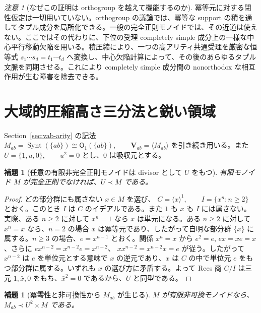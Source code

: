 \documentclass[10pt,a4paper]{ltjsarticle}
\newtheorem{lemma}[theorem]{補題}
\theoremstyle{definition}
\theoremstyle{remark}
\newtheorem{remark}[theorem]{注意}
\newcommand{\Obj}{\mathsf O}
\begin{document}
\begin{remark}[なぜこの証明は orthogroup を越えて機能するのか]
冪等元に対する閉性仮定は一切用いていない。orthogroup の議論では、冪等な support の積を通してタプル成分を局所化できる。一般の完全正則モノイドでは、その近道は使えない。ここではその代わりに、下位の受理 completely simple 成分上の一様な中心平行移動欠陥を用いる。積圧縮により、一つの高アリティ共通受理を厳密な恒等式
\(s_1\cdots s_d=t_1\cdots t_d\)
へ変換し、中心欠陥計算によって、その後のあらゆるタプル文脈を同期させる。これにより completely simple 成分間の nonorthodox な相互作用が生む障害を除去できる。
\end{remark}


\section{大域的圧縮高さ三分法と鋭い領域}
\label{sec:global-arity-trichotomy}

Section~\ref{sec:vab-arity} の記法
\(
 M_{ab}=\operatorname{Synt}(\{ab\})\cong\Obj_1(\{ab\}),
 \qquad \mathbf V_{ab}=\langle M_{ab}\rangle
\)
を引き続き用いる。また
\(U=\{1,u,0\},\qquad u^2=0\)
とし、$0$ は吸収元とする。

\begin{lemma}[任意の有限非完全正則モノイドは divisor として $U$ をもつ]
\label{global:lem:U-divisor}
有限モノイド $M$ が完全正則でなければ、$U\prec M$ である。
\end{lemma}

\begin{proof}
どの部分群にも属さない $x\in M$ を選び、
\(C=\langle x\rangle^1,\qquad I=\{x^n:n\ge2\}\)
とおく。このとき $I$ は $C$ のイデアルである。また $1$ も $x$ も $I$ には属さない。
実際、ある $n\ge2$ に対して $x^n=1$ なら $x$ は単元になる。ある $n\ge2$ に対して $x^n=x$ なら、$n=2$ の場合 $x$ は冪等元であり、したがって自明な部分群 $\{x\}$ に属する。$n\ge3$ の場合、$e=x^{n-1}$ とおく。関係 $x^n=x$ から
$e^2=e$, $ex=xe=x$、さらに
$e x^{n-2}=x^{n-2}e=x^{n-2}$、
$x x^{n-2}=x^{n-2}x=e$
が従う。したがって $x^{n-2}$ は $e$ を単位元とする意味で $x$ の逆元であり、$x$ は $C$ の中で単位元 $e$ をもつ部分群に属する。いずれも $x$ の選び方に矛盾する。よって Rees 商 $C/I$ は三元
$1,\bar x,0$ をもち、$\bar x^2=0$ であるから、$U$ と同型である。
\end{proof}

\begin{lemma}[冪零性と非可換性から $M_{ab}$ が生じる]
\label{global:lem:mixing}
$M$ が有限非可換モノイドなら、$M_{ab}\prec U^2\times M$ である。
\end{lemma}
\end{document}
